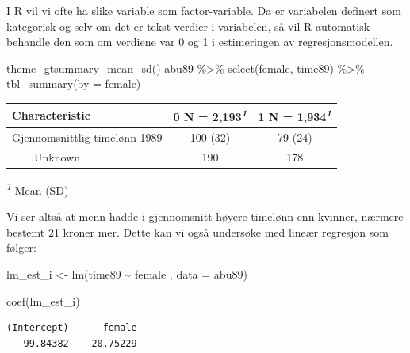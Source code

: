 \documentclass[
  norsk,
  letterpaper,
  DIV=11,
  numbers=noendperiod]{scrreprt}
\newenvironment{Shaded}{\begin{snugshade}}{\end{snugshade}}
\newcommand{\AttributeTok}[1]{\textcolor[rgb]{0.40,0.45,0.13}{#1}}
\newcommand{\FunctionTok}[1]{\textcolor[rgb]{0.28,0.35,0.67}{#1}}
\newcommand{\NormalTok}[1]{\textcolor[rgb]{0.00,0.23,0.31}{#1}}
\newcommand{\OtherTok}[1]{\textcolor[rgb]{0.00,0.23,0.31}{#1}}
\newcommand{\SpecialCharTok}[1]{\textcolor[rgb]{0.37,0.37,0.37}{#1}}
\theoremstyle{definition}
\theoremstyle{remark}
\begin{document}
I R vil vi ofte ha slike variable som factor-variable. Da er variabelen
definert som kategorisk og selv om det er tekst-verdier i variabelen, så
vil R automatisk behandle den som om verdiene var 0 og 1 i estimeringen
av regresjonsmodellen.

\begin{Shaded}
\begin{Highlighting}[]
\FunctionTok{theme\_gtsummary\_mean\_sd}\NormalTok{()}
\NormalTok{abu89 }\SpecialCharTok{\%\textgreater{}\%} 
  \FunctionTok{select}\NormalTok{(female, time89) }\SpecialCharTok{\%\textgreater{}\%} 
  \FunctionTok{tbl\_summary}\NormalTok{(}\AttributeTok{by =}\NormalTok{ female) }
\end{Highlighting}
\end{Shaded}

\begin{table}
\fontsize{12.0pt}{14.0pt}\selectfont
\begin{tabular*}{\linewidth}{@{\extracolsep{\fill}}lcc}
\toprule
\textbf{Characteristic} & \textbf{0}  N = 2,193\textsuperscript{\textit{1}} & \textbf{1}  N = 1,934\textsuperscript{\textit{1}} \\ 
\midrule\addlinespace[2.5pt]
Gjennomsnittlig timelønn 1989 & 100 (32) & 79 (24) \\ 
    Unknown & 190 & 178 \\ 
\bottomrule
\end{tabular*}
\begin{minipage}{\linewidth}
\vspace{.05em}
\textsuperscript{\textit{1}} Mean (SD)\\
\end{minipage}
\end{table}

Vi ser altså at menn hadde i gjennomsnitt høyere timelønn enn kvinner,
nærmere bestemt 21 kroner mer. Dette kan vi også undersøke med lineær
regresjon som følger:

\begin{Shaded}
\begin{Highlighting}[]
\NormalTok{lm\_est\_i }\OtherTok{\textless{}{-}} \FunctionTok{lm}\NormalTok{(time89 }\SpecialCharTok{\textasciitilde{}}\NormalTok{ female , }\AttributeTok{data =}\NormalTok{ abu89)}

\FunctionTok{coef}\NormalTok{(lm\_est\_i)}
\end{Highlighting}
\end{Shaded}

\begin{verbatim}
(Intercept)      female 
   99.84382   -20.75229 
\end{verbatim}
\end{document}
